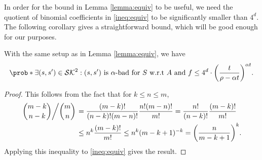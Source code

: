 In order for the bound in Lemma \ref{lemma:equiv} to be useful,
we need the quotient of binomial coefficients in \eqref{ineq:equiv}
to be significantly smaller than \(4^{d}\).
The following corollary gives a straightforward bound,
which will be good enough for our purposes.

\begin{corollary}\label{corollary:equiv}
  With the same setup as in Lemma \ref{lemma:equiv}, we have
  \begin{equation}\label{ineq:corollary:equiv}
    \prob*{\exists (s,s') \in \setSK^{2} : (s,s') \text{ is \(\alpha\)-bad for } S \text{ w.r.t \(A\) and \(f\)}}
    \le 4^{d} \cdot \left( \frac{t}{\rho - \alpha t} \right)^{\alpha t}.
  \end{equation}
\end{corollary}

\begin{proof}
  This follows from the fact that for \(k \le n \le m\),
  \begin{align}
    \left. \binom{m - k}{n - k} \middle/ \binom{m}{n} \right.
    & = \frac{(m-k)!}{(n-k)!(m-n)!} \frac{n!(m-n)!}{m!}
    = \frac{n!}{(n-k)!} \frac{(m-k)!}{m!} \notag\\
    & \le n^{k} \frac{(m-k)!}{m!} \notag
    \le n^{k} (m-k+1)^{-k}
    = \left( \frac{n}{m - k + 1} \right)^{k}. \notag
  \end{align}
  Applying this inequality to \eqref{ineq:equiv} gives the result.
\end{proof}



